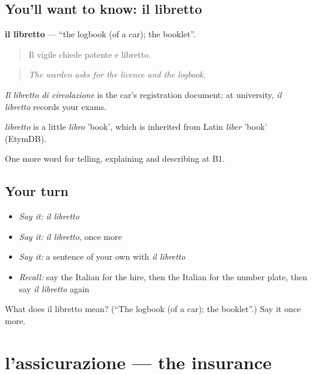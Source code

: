 \subsection*{You'll want to know: il libretto}
\textbf{il libretto} — \textquotedblleft{}the logbook (of a car); the booklet\textquotedblright{}.

\begin{quote}
Il vigile chiede patente e libretto.
\end{quote}

\begin{quote}
\emph{The warden asks for the licence and the logbook.}
\end{quote}

\emph{Il libretto di circolazione} is the car's registration document; at university, \emph{il libretto} records your exams.

\begin{cousinweb}
\emph{libretto} is a little \emph{libro} 'book', which is inherited from Latin \emph{liber} 'book' (EtymDB).
\end{cousinweb}

\begin{grammarlens}[title={What you've built}]
One more word for telling, explaining and describing at B1.
\end{grammarlens}

\subsection*{Your turn}
\begin{itemize}
\raggedright
  \item \emph{Say it:} \emph{il libretto}
  \item \emph{Say it:} \emph{il libretto}, once more
  \item \emph{Say it:} a sentence of your own with \emph{il libretto}
  \item \emph{Recall:} say the Italian for the hire, then the Italian for the number plate, then say \emph{il libretto} again
\end{itemize}

\begin{tcolorbox}[breakable,colback=teal!4,colframe=teal!35!black,title={Before you move on}]
What does il libretto mean? (\textquotedblleft{}The logbook (of a car); the booklet\textquotedblright{}.) Say it once more.
\end{tcolorbox}
\section[l'assicurazione]{l'assicurazione — the insurance}

